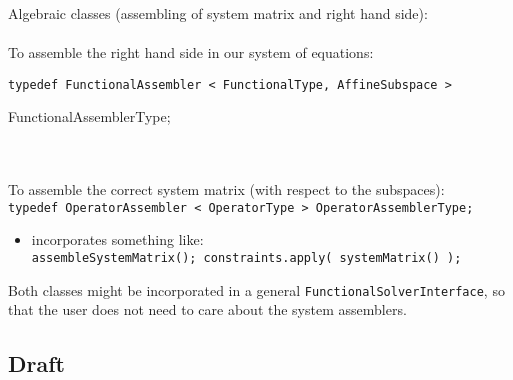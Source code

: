 \documentclass[a4paper,11pt]{article}
\numberwithin{equation}{section}
\begin{document}
Algebraic classes (assembling of system matrix and right hand side):\\
\\
To assemble the right hand side in our system of equations:\\
{\tt typedef FunctionalAssembler < FunctionalType, AffineSubspace >

FunctionalAssemblerType;}\\
\\
To assemble the correct system matrix (with respect to the subspaces):\\
{\tt typedef OperatorAssembler < OperatorType > OperatorAssemblerType;}
\begin{itemize}
\item incorporates something like:\\
{\tt assembleSystemMatrix(); constraints.apply( systemMatrix() );}\\
\end{itemize}
Both classes might be incorporated in a general {\tt FunctionalSolverInterface}, so that the user does not need to care about the system assemblers.


\subsection{Draft}
\end{document}
